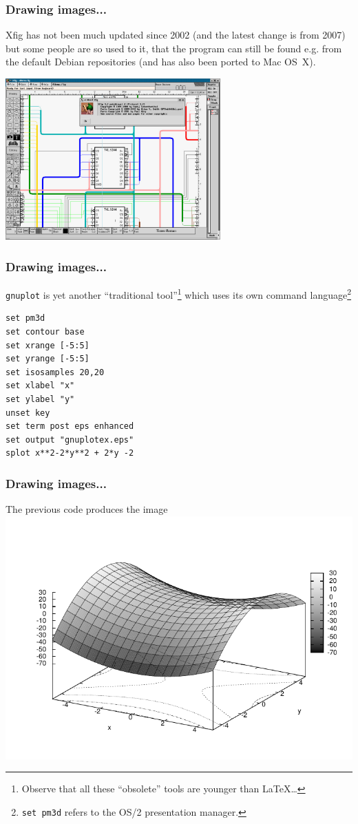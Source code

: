 \documentclass[13pt]{beamer}
\begin{document}
\begin{frame}[fragile]\frametitle{Drawing images...}
\small Xfig has not been much updated since 2002 (and the latest change is from
2007) but some people are so used to it, that the program can still be found 
e.g. from the default Debian repositories (and has also been ported to 
Mac OS~X).
\begin{center}
\includegraphics[width=0.62\textwidth]{img/xfig}
\end{center}
\end{frame}


\begin{frame}[fragile]\frametitle{Drawing images...}
\texttt{gnuplot} is yet another ``traditional tool''\footnote{Observe that
all these ``obsolete'' tools are younger than LaTeX\ldots} which uses
its own command language\footnote{\texttt{set pm3d} refers to the OS/2
presentation manager.}
\begin{verbatim}
set pm3d
set contour base
set xrange [-5:5]
set yrange [-5:5]
set isosamples 20,20
set xlabel "x"
set ylabel "y"
unset key
set term post eps enhanced
set output "gnuplotex.eps"
splot x**2-2*y**2 + 2*y -2
\end{verbatim}
\end{frame}


\begin{frame}[fragile]\frametitle{Drawing images...}
The previous code produces the image\\[-2ex]
\hspace*{-1cm}\includegraphics[width=1.1\textwidth]{img/gnuplotex}
\end{frame}
\end{document}
